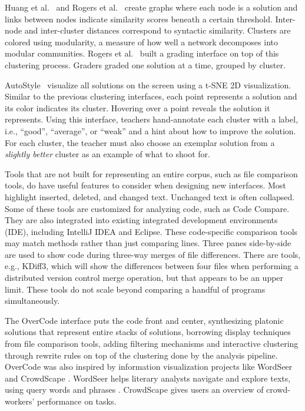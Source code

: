 Huang et al.~\cite{MOOCshop} and Rogers et al.~\cite{ACESthesis} create graphs where each node is a solution and links between nodes indicate similarity scores beneath a certain threshold. Inter-node and inter-cluster distances correspond to syntactic similarity. Clusters are colored using modularity, a measure of how well a network decomposes into modular communities. Rogers et al.~\cite{ACESthesis} built a grading interface on top of this clustering process. Graders graded one solution at a time, grouped by cluster.

AutoStyle~\cite{choudhury2016autostyle} visualize all solutions on the screen using a t-SNE 2D visualization. Similar to the previous clustering interfaces, each point represents a solution and its color indicates its cluster. Hovering over a point reveals the solution it represents. Using this interface, teachers hand-annotate each cluster with a label, i.e., ``good'', ``average'', or ``weak'' and a hint about how to improve the solution. For each cluster, the teacher must also choose an exemplar solution from a {\it slightly better} cluster as an example of what to shoot for.

Tools that are not built for representing an entire corpus, such as file comparison tools, do have useful features to consider when designing new interfaces. Most highlight inserted, deleted, and changed text. Unchanged text is often collapsed. Some of these tools are customized for analyzing code, such as Code Compare. They are also integrated into existing integrated development environments (IDE), including IntelliJ IDEA and Eclipse. These code-specific comparison tools may match methods rather than just comparing lines. Three panes side-by-side are used to show code during three-way merges of file differences. There are tools, e.g., KDiff3, which will show the differences between four files when performing a distributed version control merge operation, but that appears to be an upper limit. These tools do not scale beyond comparing a handful of programs simultaneously.

The OverCode interface puts the code front and center, synthesizing platonic solutions that represent entire stacks of solutions, borrowing display techniques from file comparison tools, adding filtering mechanisms and interactive clustering through rewrite rules on top of the clustering done by the analysis pipeline. OverCode was also inspired by information visualization projects like WordSeer \cite{wordseerlitcomp13,wordseercikm13} and CrowdScape \cite{crowdscape}. WordSeer helps literary analysts navigate and explore texts, using query words and phrases \cite{wordseerhcir11}. CrowdScape gives users an overview of crowd-workers' performance on tasks.

